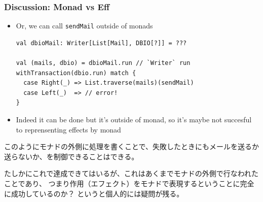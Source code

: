 \begin{frame}[fragile]
  \frametitle{Discussion: Monad vs Eff}

  \begin{itemize}
    \item<+-> Or, we can call \lstinline|sendMail| outside
    of monads
\begin{lstlisting}[style=scala]
val dbioMail: Writer[List[Mail], DBIO[?]] = ???

val (mails, dbio) = dbioMail.run // `Writer` run
withTransaction(dbio.run) match {
  case Right(_) => List.traverse(mails)(sendMail)
  case Left(_)  => // error!
}
\end{lstlisting}

    \item<+-> Indeed it can be done but it's outside of monad,
    so it's maybe not succesful to reprensenting effects by monad
  \end{itemize}

  \begin{notes}
    \item このようにモナドの外側に処理を書くことで、失敗したときにもメールを送るか
    送らないか、を制御できることはできる。

    \item たしかにこれで達成できてはいるが、これはあくまでモナドの外側で行なわれたことであり、
    つまり作用（エフェクト）をモナドで表現するということに完全に成功しているのか？
    というと個人的には疑問が残る。
  \end{notes}
\end{frame}

